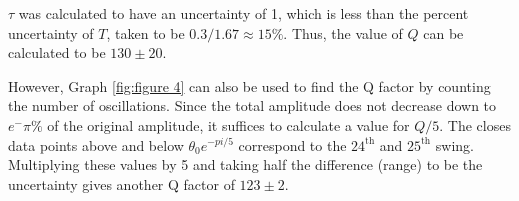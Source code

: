 \documentclass[12pt]{article}
\begin{document}
$\tau$ was calculated to have an uncertainty of 1, which is less than the percent uncertainty of $T$, taken to be $0.3/1.67 \approx 15\%$. Thus, the value of $Q$ can be calculated to be $130 \pm 20$.

However, Graph \ref{fig:figure 4} can also be used to find the Q factor by counting the number of oscillations. Since the total amplitude does not decrease down to $e^-\pi \%$ of the original amplitude, it suffices to calculate a value for $Q/5$. The closes data points above and below $\theta_0e^{-{pi/5}}$ correspond to the $24^\text{th}$ and $25^\text{th}$ swing. Multiplying these values by 5 and taking half the difference (range) to be the uncertainty gives another Q factor of $123 \pm 2$.

\end{document}
